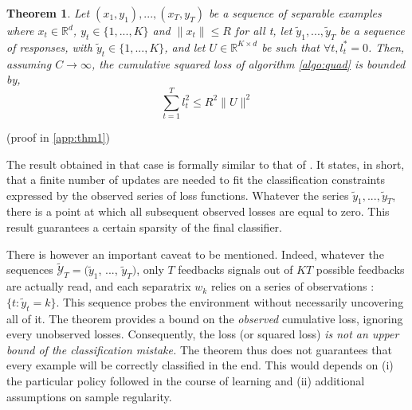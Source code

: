 \documentclass[preprint,12pt,authoryear]{elsarticle}
\newtheorem{theorem}{Theorem}
\begin{document}

\begin{theorem}
	\label{theo:BPAT1}
	Let $(x_1,y_1),...,(x_T,y_T)$ be a sequence of separable examples where $x_t \in \mathbb{R}^d$, $y_t\in \{1,...,K\}$ and $\parallel x_t \parallel\leqslant R$ for all t, let $\tilde{y}_1,...,\tilde{y}_T$ be a sequence of responses, with $\tilde{y}_t\in \{1,...,K\}$, 
	and let $U \in \mathbb{R}^{K\times d}$ be such that $ \forall t, l^*_t=0$. Then, assuming $C \rightarrow \infty$, the cumulative squared loss of algorithm \ref{algo:quad} is bounded by,
	\begin{equation}
	\sum_{t=1}^{T} l_t^2 \leqslant R^2 \parallel{U}\parallel^2
	\end{equation}
\end{theorem}
(proof in \ref{app:thm1})

The result obtained in that case is formally similar to that of  \cite{crammer2006online}. It states, in short, that a finite number of updates are needed to fit the classification constraints expressed by the observed series of loss functions. Whatever the series $\tilde{y}_1, ...,\tilde{y}_T$, there is a point at which all subsequent observed losses are equal to zero. This result guarantees a certain sparsity of the final classifier.

There is however an important caveat to be mentioned. 
Indeed, whatever the sequences $\tilde{\mathcal{Y}}_T = (\tilde{y}_1$, ..., $\tilde{y}_T)$, only $T$ feedbacks signals out of $KT$ possible feedbacks are actually read,
and each separatrix $w_k$ relies on a series of observations : $\{t: \tilde{y}_t = k\}$.
This sequence probes the environment without necessarily uncovering all of it. The theorem provides a bound on the \emph{observed} cumulative loss, ignoring every unobserved losses. 
Consequently, the loss (or squared loss) \emph{is not an upper bound of the classification mistake.} The theorem thus does not guarantees that every example will be correctly classified in the end. This would depends on (i) the particular policy followed in the course of learning and (ii)  additional assumptions on sample regularity.   
\end{document}
